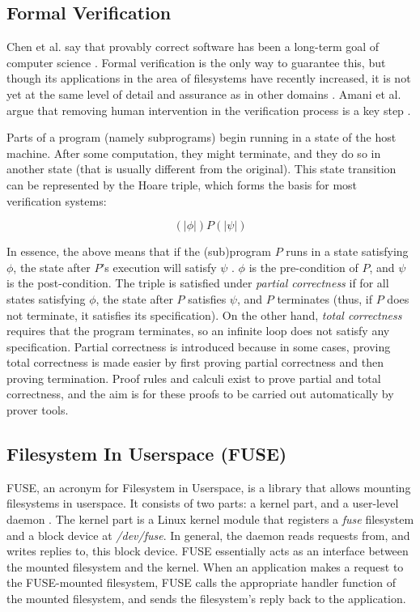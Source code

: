 \subsection{Formal Verification}
Chen et al. say that provably correct software has been a long-term goal of computer science \cite{chen2015}.
Formal verification is the only way to guarantee this, but though its applications in the area of filesystems have recently increased, it is not yet at the same level of detail and assurance as in other domains \cite{amani2016}.
Amani et al. argue that removing human intervention in the verification process is a key step \cite{amani2016}.

Parts of a program (namely subprograms) begin running in a state of the host machine.
After some computation, they might terminate, and they do so in another state (that is usually different from the original).
This state transition can be represented by the Hoare triple, which forms the basis for most verification systems:

$$(\!|\phi|\!) P (\!|\psi|\!)$$

In essence, the above means that if the (sub)program $P$ runs in a state satisfying $\phi$, the state after $P$'s execution will satisfy $\psi$ \cite{huth2004}.
$\phi$ is the pre-condition of $P$, and $\psi$ is the post-condition.
The triple is satisfied under \textit{partial correctness} if for all states satisfying $\phi$, the state after $P$ satisfies $\psi$, and $P$ terminates (thus, if $P$ does not terminate, it satisfies its specification).
On the other hand, \textit{total correctness} requires that the program terminates, so an infinite loop does not satisfy any specification.
Partial correctness is introduced because in some cases, proving total correctness is made easier by first proving partial correctness and then proving termination.
Proof rules and calculi exist to prove partial and total correctness, and the aim is for these proofs to be carried out automatically by prover tools.

\subsection{Filesystem In Userspace (FUSE)}
FUSE, an acronym for Filesystem in Userspace, is a library that allows mounting filesystems in userspace.
It consists of two parts: a kernel part, and a user-level daemon \cite{vangoor2017}.
The kernel part is a Linux kernel module that registers a \textit{fuse} filesystem and a block device at \textit{/dev/fuse}.
In general, the daemon reads requests from, and writes replies to, this block device.
FUSE essentially acts as an interface between the mounted filesystem and the kernel.
When an application makes a request to the FUSE-mounted filesystem, FUSE calls the appropriate handler function of the mounted filesystem, and sends the filesystem's reply back to the application.

